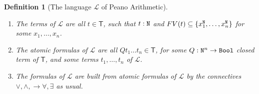 \documentclass[copyright,creativecommons]{eptcs}
\newcommand{\Nat}                      { {\tt N} }
\newcommand{\Bool}                     { {\tt Bool} }
\newcommand{\SystemT}                  {\mathsf{T}}
\newtheorem{definition}{Definition}
\begin{document}
\begin{definition}[The language $\mathcal{L}$ of Peano Arithmetic] \label{definition-extendedarithmetic} 

\begin{enumerate}

\item
The terms of $\mathcal{L}$ are all $t \in \SystemT$, such that $t:\Nat$ and $FV(t) \subseteq \{x_1^\Nat, \ldots, x_n^\Nat\}$ for some $x_1, \ldots, x_n$.

\item
The atomic formulas of $\mathcal{L}$ are all $Qt_1\ldots t_n \in \SystemT$, for some $Q:\Nat^{n}\rightarrow \Bool$ {\em closed term of $\SystemT$}, and some terms $t_1,\ldots,t_n$ of $\mathcal{L}$.


\item
The formulas of $\mathcal{L}$ are built from atomic formulas of $\mathcal{L}$ by the connectives $\lor,\land,\rightarrow \forall,\exists$ as usual.
\end{enumerate}


\end{definition}
\end{document}
